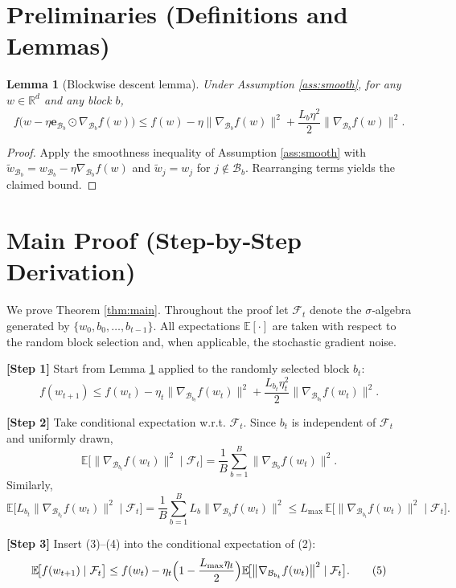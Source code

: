 \documentclass[11pt]{article}
\newcommand{\EE}{\mathbb{E}}
\newcommand{\RR}{\mathbb{R}}
\newcommand{\grad}{\nabla}
\newcommand{\block}[1]{\mathcal{B}_{#1}}
\newtheorem{lemma}{Lemma}
\begin{document}
\newpage
\section*{Preliminaries (Definitions and Lemmas)}
\begin{lemma}[Blockwise descent lemma]
\label{lem:descent}
Under Assumption \ref{ass:smooth}, for any $w\in\RR^{d}$ and any block $b$,
\[
f\!\big(w - \eta \mathbf{e}_{\block{b}}\odot \grad_{\block{b}} f(w)\big)
\le
f(w) - \eta\big\|\grad_{\block{b}} f(w)\big\|^2
+ \frac{L_b\eta^2}{2}\big\|\grad_{\block{b}} f(w)\big\|^2 .
\]
\end{lemma}
\begin{proof}
Apply the smoothness inequality of Assumption \ref{ass:smooth} with
$\tilde w_{\block{b}} = w_{\block{b}} - \eta \grad_{\block{b}} f(w)$ and
$\tilde w_{j}=w_{j}$ for $j\notin\block{b}$.  Rearranging terms yields the claimed bound. \qedhere
\end{proof}

\section*{Main Proof (Step‑by‑Step Derivation)}
We prove Theorem \ref{thm:main}.  Throughout the proof let
$\mathcal{F}_t$ denote the $\sigma$‑algebra generated by
$\{w_0,b_0,\dots ,b_{t-1}\}$.
All expectations $\EE[\cdot]$ are taken with respect to the random block
selection and, when applicable, the stochastic gradient noise.

\medskip
\noindent\textbf{[Step 1]}  Start from Lemma \ref{lem:descent} applied to the
randomly selected block $b_t$:
\[
f(w_{t+1})
\le
f(w_t) - \eta_t\big\|\grad_{\block{b_t}} f(w_t)\big\|^2
+ \frac{L_{b_t}\eta_t^{2}}{2}\big\|\grad_{\block{b_t}} f(w_t)\big\|^2 .
\tag{2}
\]

\noindent\textbf{[Step 2]}  Take conditional expectation w.r.t. $\mathcal{F}_t$.
Since $b_t$ is independent of $\mathcal{F}_t$ and uniformly drawn,
\[
\EE\!\big[ \big\|\grad_{\block{b_t}} f(w_t)\big\|^2 \mid \mathcal{F}_t\big]
= \frac1B \sum_{b=1}^{B} \big\|\grad_{\block{b}} f(w_t)\big\|^2 .
\tag{3}
\]
Similarly,
\[
\EE\!\big[ L_{b_t}\big\|\grad_{\block{b_t}} f(w_t)\big\|^2 \mid \mathcal{F}_t\big]
= \frac1B \sum_{b=1}^{B} L_{b}\big\|\grad_{\block{b}} f(w_t)\big\|^2
\le L_{\max}\,\EE\!\big[ \big\|\grad_{\block{b_t}} f(w_t)\big\|^2 \mid \mathcal{F}_t\big].
\tag{4}
\]

\noindent\textbf{[Step 3]}  Insert (3)–(4) into the conditional expectation of (2):
\[
\EE\!\big[ f(w_{t+1})\mid\mathcal{F}_t\big]
\le
f(w_t)
- \eta_t\Bigl(1-\frac{L_{\max}\eta_t}{2}\Bigr)
\EE\!\big[ \big\|\grad_{\block{b_t}} f(w_t)\big\|^2 \mid \mathcal{F}_t\big].
\tag{5}
\]
\end{document}
